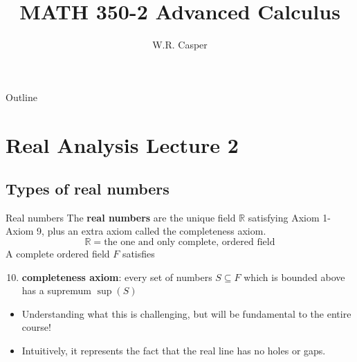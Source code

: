 \documentclass{beamer}
\title{MATH 350-2 Advanced Calculus}
\subtitle
{} %
\author[W.R. Casper] %
{W.R. Casper}
\institute[California State University Fullerton] %
{
  Department of Mathematics\\
  California State University Fullerton}
\begin{document}
\begin{frame}
  \titlepage
\end{frame}

\begin{frame}{Outline}
  \tableofcontents
\end{frame}



\section{Real Analysis Lecture 2}

\subsection{Types of real numbers}
\begin{frame}{Real numbers}
The \textbf{real numbers} are the unique field $\mathbb{R}$ satisfying Axiom 1-Axiom 9, plus an extra axiom called the completeness axiom.
$$\mathbb{R} = \text{the one and only complete, ordered field}$$
A complete ordered field $F$ satisfies
\begin{enumerate}[\text{A}1]
\setcounter{enumi}{9}
\pause
\item \textbf{completeness axiom}: every set of numbers $S\subseteq F$ which is bounded above has a supremum $\sup(S)$
\end{enumerate}
\begin{itemize}
\pause
\item Understanding what this is challenging, but will be fundamental to the entire course!
\pause
\item Intuitively, it represents the fact that the real line has no holes or gaps.
\end{itemize}
\end{frame}
\end{document}
